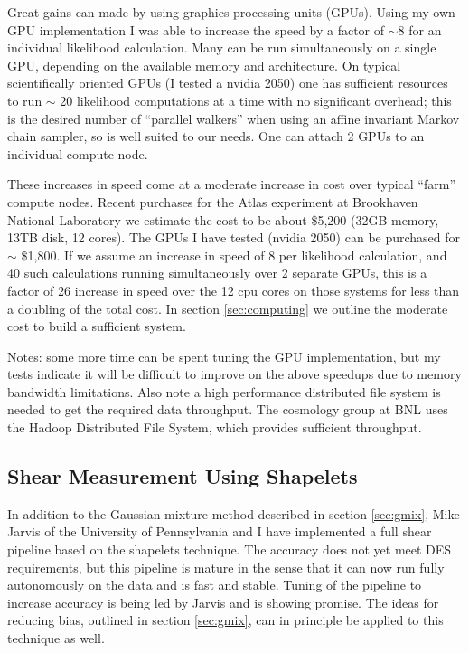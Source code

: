 \documentclass[12pt]{article}
\begin{document}
Great gains can made by using graphics processing units (GPUs).  Using my own
GPU implementation I was able to increase the speed by a factor of $\sim 8$ for
an individual likelihood calculation. Many can be run simultaneously on a
single GPU, depending on the available memory and architecture.  On typical
scientifically oriented GPUs (I tested a nvidia 2050) one has sufficient
resources to run $\sim$ 20 likelihood computations at a time with no
significant overhead; this is the desired number of ``parallel walkers'' when
using an affine invariant Markov chain sampler, so is well suited to our needs.
One can attach 2 GPUs to an individual compute node.

These increases in speed come at a moderate increase in cost over typical
``farm'' compute nodes.  Recent purchases for the Atlas experiment at
Brookhaven National Laboratory we estimate the cost to be about \$5,200 (32GB
memory, 13TB disk, 12 cores).  The GPUs I have tested (nvidia 2050) can be
purchased for $\sim$ \$1,800.  If we assume an increase in speed of 8 per
likelihood calculation, and 40 such calculations running simultaneously over 2
separate GPUs, this is a factor of 26 increase in speed over the 12 cpu cores
on those systems for less than a doubling of the total cost.  In section
\ref{sec:computing} we outline the moderate cost to build a sufficient system.

Notes: some more time can be spent tuning the GPU implementation, but my tests
indicate it will be difficult to improve on the above speedups due to memory
bandwidth limitations.  Also note a high performance distributed file system is
needed to get the required data throughput.  The cosmology group at BNL uses
the Hadoop Distributed File System, which provides sufficient throughput.


\subsection{Shear Measurement Using Shapelets}
\label{sec:shapelets}

In addition to the Gaussian mixture method described in section \ref{sec:gmix},
Mike Jarvis of the University of Pennsylvania and I have implemented a full
shear pipeline based on the shapelets technique\cite{Bern02}.   The accuracy
does not yet meet DES requirements, but this pipeline is mature in the sense
that it can now run fully autonomously on the data and is fast and stable.
Tuning of the pipeline to increase accuracy is being led by Jarvis and is
showing promise.   The ideas for reducing bias, outlined in section
\ref{sec:gmix}, can in principle be applied to this technique as well.
\end{document}
